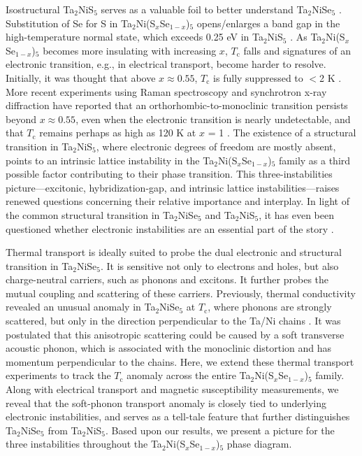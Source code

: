 \documentclass[aps,prl,twocolumn,superscriptaddress]{revtex4-2}
\begin{document}
Isostructural Ta$_2$NiS$_5$ serves as a valuable foil to better understand Ta$_2$NiSe$_5$ \cite{DiSalvo_1986}. Substitution of Se for S in Ta$_2$Ni(S$_x$Se$_{1-x}$)$_5$ opens/enlarges a band gap in the high-temperature normal state, which exceeds 0.25 eV in Ta$_2$NiS$_5$ \cite{Larkin_2017}. As Ta$_2$Ni(S$_x$Se$_{1-x}$)$_5$ becomes more insulating with increasing $x$, $T_\textrm{c}$ falls and signatures of an electronic transition, e.g., in electrical transport, become harder to resolve. Initially, it was thought that above $x \approx 0.55$, $T_\textrm{c}$ is fully suppressed to $<$2 K \cite{Lu_NatComm_2017}. More recent experiments using Raman spectroscopy \cite{Volkov_PRB_2021, Ye_2021} and synchrotron x-ray diffraction \cite{Chen_NatComm_2023} have reported that an orthorhombic-to-monoclinic transition persists beyond $x \approx 0.55$, even when the electronic transition is nearly undetectable, and that $T_\textrm{c}$ remains perhaps as high as 120 K at $x$ = 1 \cite{Volkov_PRB_2021, Ye_2021}. The existence of a structural transition in Ta$_2$NiS$_5$, where electronic degrees of freedom are mostly absent, points to an intrinsic lattice instability in the Ta$_2$Ni(S$_x$Se$_{1-x}$)$_5$ family as a third possible factor contributing to their phase transition. This three-instabilities picture---excitonic, hybridization-gap, and intrinsic lattice instabilities---raises renewed questions concerning their relative importance and interplay. In light of the common structural transition in Ta$_2$NiSe$_5$ and Ta$_2$NiS$_5$, it has even been questioned whether electronic instabilities are an essential part of the story \cite{Windgaetter_2021}.

Thermal transport is ideally suited to probe the dual electronic and structural transition in Ta$_2$NiSe$_5$. It is sensitive not only to electrons and holes, but also charge-neutral carriers, such as phonons and excitons. It further probes the mutual coupling and scattering of these carriers. Previously, thermal conductivity revealed an unusual anomaly in Ta$_2$NiSe$_5$ at $T_\textrm{c}$, where phonons are strongly scattered, but only in the direction perpendicular to the Ta/Ni chains \cite{Zhang_PRB_2021}. It was postulated that this anisotropic scattering could be caused by a soft transverse acoustic phonon, which is associated with the monoclinic distortion and has momentum perpendicular to the chains. Here, we extend these thermal transport experiments to track the $T_\textrm{c}$ anomaly across the entire Ta$_2$Ni(S$_x$Se$_{1-x}$)$_5$ family. Along with electrical transport and magnetic susceptibility measurements, we reveal that the soft-phonon transport anomaly is closely tied to underlying electronic instabilities, and serves as a tell-tale feature that further distinguishes Ta$_2$NiSe$_5$ from Ta$_2$NiS$_5$. Based upon our results, we present a picture for the three instabilities throughout the Ta$_2$Ni(S$_x$Se$_{1-x}$)$_5$ phase diagram.
\end{document}
